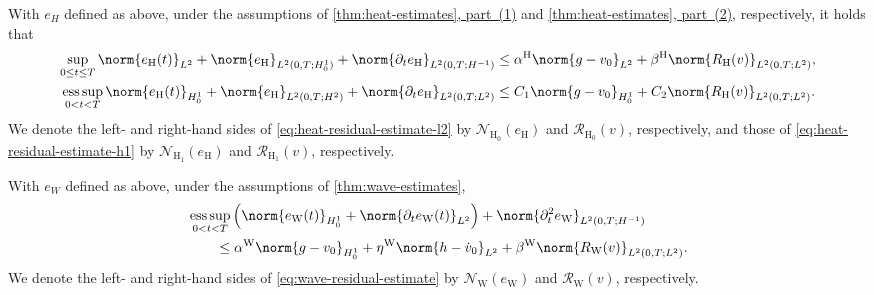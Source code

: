 \begin{corollary}\label{cor:heat-residual-estimates}
With $e_H$ defined as above, under the assumptions of
\hyperref[thm:heat-estimates-l2]{\cref*{thm:heat-estimates}, part~\textup{(1)}} and
\hyperref[thm:heat-estimates-h1]{\cref*{thm:heat-estimates}, part~\textup{(2)}},
respectively, it holds that
\begin{subequations}\label{eq:heat-residual-estimates}
\begin{align}
    \sup_{0\le t\le T}\norm{e_{\mathrm H}(t)}_{L^2}
    +\norm{e_{\mathrm H}}_{L^2(0,T;H_0^1)}
    +\norm{\partial_t e_{\mathrm H}}_{L^2(0,T;H^{-1})}
    &\le
    \alpha^{\mathrm H}\norm{g-v_0}_{L^2}
    +
    \beta^{\mathrm H}\norm{R_{\mathrm H}(v)}_{L^2(0,T;L^2)}, \label{eq:heat-residual-estimate-l2}
    \\
    \operatorname*{ess\,sup}_{0<t<T}\norm{e_{\mathrm H}(t)}_{H_0^1}
    +\norm{e_{\mathrm H}}_{L^2(0,T;H^2)}
    +\norm{\partial_t e_{\mathrm H}}_{L^2(0,T;L^2)}
    &\le
    C_1\norm{g-v_0}_{H_0^1}
    +
    C_2\norm{R_{\mathrm H}(v)}_{L^2(0,T;L^2)} . \label{eq:heat-residual-estimate-h1}
\end{align}
\end{subequations}
We denote the left- and right-hand sides of
\eqref{eq:heat-residual-estimate-l2} by
$\mathcal N_{\mathrm H_0}(e_{\mathrm H})$ and
$\mathcal R_{\mathrm H_0}(v)$, respectively, and those of
\eqref{eq:heat-residual-estimate-h1} by
$\mathcal N_{\mathrm H_1}(e_{\mathrm H})$ and
$\mathcal R_{\mathrm H_1}(v)$, respectively.
\end{corollary}

\begin{corollary}\label{cor:wave-residual-estimate}
With $e_W$ defined as above, under the assumptions of \cref{thm:wave-estimates},
\begin{equation}\label{eq:wave-residual-estimate}
\begin{split}
    &\operatorname*{ess\,sup}_{0<t<T}
    \left(
        \norm{e_{\mathrm W}(t)}_{H_0^1}
        +
        \norm{\partial_t e_{\mathrm W}(t)}_{L^2}
    \right)
    +
    \norm{\partial_t^2 e_{\mathrm W}}_{L^2(0,T;H^{-1})}
    \\
    &\qquad\le
    \alpha^{\mathrm W}\norm{g-v_0}_{H_0^1}
    +
    \eta^{\mathrm W}\norm{h-\dot v_0}_{L^2}
    +
    \beta^{\mathrm W}\norm{R_{\mathrm W}(v)}_{L^2(0,T;L^2)} .
\end{split}
\end{equation}
We denote the left- and right-hand sides of
\eqref{eq:wave-residual-estimate} by
$\mathcal N_{\mathrm W}(e_{\mathrm W})$ and
$\mathcal R_{\mathrm W}(v)$, respectively.
\end{corollary}

